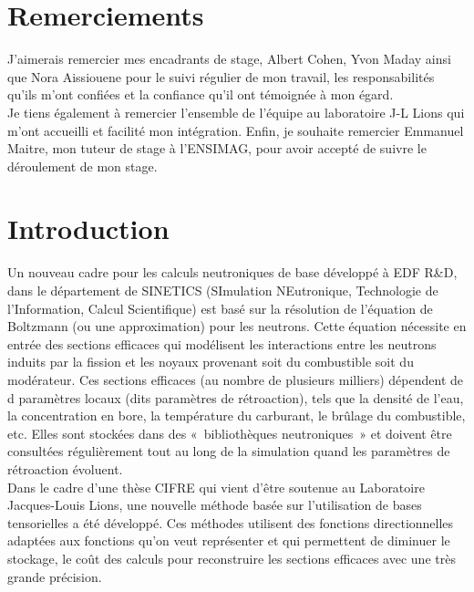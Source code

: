 \section*{Remerciements}
\hspace{0.5cm}
J’aimerais remercier mes encadrants de stage, Albert Cohen, Yvon Maday ainsi que Nora Aissiouene pour le suivi régulier de mon travail, les responsabilités qu’ils m’ont confiées et la confiance qu’il ont témoignée à mon égard.\\
Je tiens également à remercier l’ensemble de l’équipe au laboratoire J-L Lions qui m’ont accueilli et facilité mon intégration.
Enfin, je souhaite remercier Emmanuel Maitre, mon tuteur de stage à l’ENSIMAG, pour avoir accepté de suivre le déroulement de mon stage.


\section{Introduction}\label{sec:1}
\hspace{0.5cm}
Un nouveau cadre pour les calculs neutroniques de base développé à EDF R\&D, dans le département de SINETICS (SImulation NEutronique, Technologie de l’Information, Calcul Scientifique) est basé sur la résolution de l’équation de Boltzmann (ou une approximation) pour les neutrons.
Cette équation nécessite en entrée des sections efficaces qui modélisent les interactions entre les neutrons induits par la fission et les noyaux provenant soit du combustible soit du modérateur. Ces sections efficaces (au nombre de plusieurs milliers) dépendent de d paramètres locaux (dits paramètres de rétroaction), tels que la densité de l’eau, la concentration en bore, la température du carburant, le brûlage du combustible, etc. Elles sont stockées dans des « bibliothèques neutroniques » et doivent être consultées régulièrement tout au long de la simulation quand les paramètres de rétroaction évoluent. \\

Dans le cadre d’une thèse CIFRE \cite{These} qui vient d’être soutenue au Laboratoire Jacques-Louis Lions, une nouvelle méthode \cite{Luu} basée sur l’utilisation de bases tensorielles a été développé. Ces méthodes utilisent des fonctions directionnelles adaptées aux fonctions qu’on veut représenter et qui permettent de diminuer le stockage, le coût des calculs pour reconstruire les sections efficaces avec une très grande précision. \\

